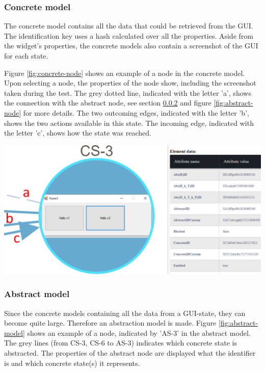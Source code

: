 \subsubsection{Concrete model}
The concrete model contains all the data that could be retrieved from the GUI. The identification key uses a hash calculated over all the properties. Aside from the widget's properties, the concrete models also contain a screenshot of the GUI for each state.

Figure \ref{fig:concrete-node} shows an example of a node in the concrete model. Upon selecting a node, the properties of the node show, including the screenshot taken during the test. The grey dotted line, indicated with the letter 'a', shows the connection with the abstract node, see section \ref{abstract-model} and figure \ref{fig:abstract-node} for more details. The two outcoming edges, indicated with the letter 'b', shows the two actions available in this state. The incoming edge, indicated with the letter 'c', shows how the state was reached. 

\bigskip
\begingroup
\captionsetup{type=figure}
\includegraphics[scale=0.5]{document/pics/concrete-model.png}
\label{fig:concrete-node}
\endgroup

\subsubsection{Abstract model} \label{abstract-model}
Since the concrete models containing all the data from a GUI-state, they can become quite large.  Therefore an abstraction model is made. Figure \ref{fig:abstract-model} shows an example of a node, indicated by 'AS-3'  in the abstract model. The grey lines (from CS-3, CS-6 to AS-3) indicates which concrete state is abstracted. The properties of the abstract node are displayed what the identifier is and which concrete state(s) it represents.

